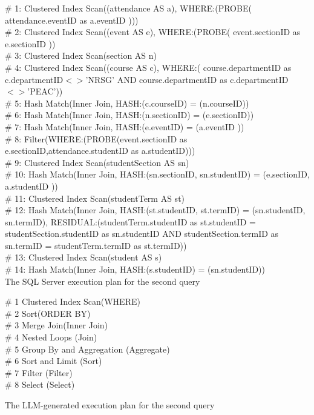 \begin{text}
  \raggedright
  \ContinuedFloat
  \# 1: Clustered Index Scan((attendance AS a), WHERE:(PROBE( attendance.eventID as a.eventID )))\\
  \# 2: Clustered Index Scan((event AS e), WHERE:(PROBE( event.sectionID as e.sectionID ))\\
  \# 3: Clustered Index Scan(section AS n)\\
  \# 4: Clustered Index Scan((course AS c), WHERE:( course.departmentID as c.departmentID$<>$'NRSG' AND course.departmentID as c.departmentID$<>$'PEAC'))\\
  \# 5: Hash Match(Inner Join, HASH:(c.courseID) = (n.courseID))\\
  \# 6: Hash Match(Inner Join, HASH:(n.sectionID) = (e.sectionID))\\
  \# 7: Hash Match(Inner Join, HASH:(e.eventID) = (a.eventID ))\\
  \# 8: Filter(WHERE:(PROBE(event.sectionID as e.sectionID,attendance.studentID as a.studentID)))\\
  \# 9: Clustered Index Scan(studentSection AS sn)\\
  \# 10: Hash Match(Inner Join, HASH:(sn.sectionID, sn.studentID) = (e.sectionID, a.studentID ))\\
  \# 11: Clustered Index Scan(studentTerm AS st)\\
  \# 12: Hash Match(Inner Join, HASH:(st.studentID, st.termID) = (sn.studentID, sn.termID), RESIDUAL:(studentTerm.studentID as st.studentID = studentSection.studentID as sn.studentID AND studentSection.termID as sn.termID = studentTerm.termID as st.termID))\\
  \# 13: Clustered Index Scan(student AS s)\\
  \# 14: Hash Match(Inner Join, HASH:(s.studentID) = (sn.studentID))\\
  \caption{The SQL Server execution plan for the second query}
\end{text}

\begin{text}
  \raggedright
  \ContinuedFloat
  \# 1 Clustered Index Scan(WHERE)\\
  \# 2 Sort(ORDER BY)\\
  \# 3 Merge Join(Inner Join)\\
  \# 4 Nested Loops (Join)\\
  \# 5 Group By and Aggregation (Aggregate)\\
  \# 6 Sort and Limit (Sort)\\
  \# 7 Filter (Filter)\\
  \# 8 Select (Select)
  \caption{The LLM-generated execution plan for the second query}
\end{text}

